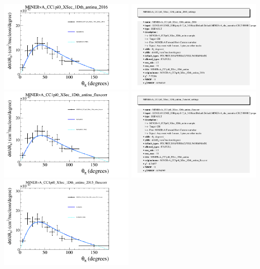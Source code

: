 \documentclass{article}
\begin{document}
\centering
\includegraphics[width=0.49\textwidth]{figures/nuisance_MINERvA_CC1pi0_XSec_1Dth_antinu_2016_comp.png}
\includegraphics[width=0.49\textwidth]{figures/nuisance_MINERvA_CC1pi0_XSec_1Dth_antinu_2016_info.png}
\centering
\includegraphics[width=0.49\textwidth]{figures/nuisance_MINERvA_CC1pi0_XSec_1Dth_antinu_fluxcorr_comp.png}
\includegraphics[width=0.49\textwidth]{figures/nuisance_MINERvA_CC1pi0_XSec_1Dth_antinu_fluxcorr_info.png}
\centering
\includegraphics[width=0.49\textwidth]{figures/nuisance_MINERvA_CC1pi0_XSec_1Dth_antinu_2015_fluxcorr_comp.png}
\end{document}
